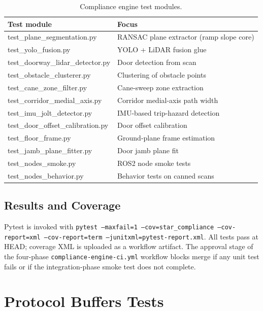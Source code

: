 \documentclass[11pt,letterpaper]{article}
\begin{document}
\begin{table}[H]
\centering
\caption{Compliance engine test modules.}
\label{tab:comp-tests}
\small
\begin{tabularx}{\linewidth}{l X}
\toprule
\textbf{Test module} & \textbf{Focus} \\
\midrule
test\_plane\_segmentation.py    & RANSAC plane extractor (ramp slope core) \\
test\_yolo\_fusion.py           & YOLO + LiDAR fusion glue \\
test\_doorway\_lidar\_detector.py & Door detection from scan \\
test\_obstacle\_clusterer.py    & Clustering of obstacle points \\
test\_cane\_zone\_filter.py     & Cane-sweep zone extraction \\
test\_corridor\_medial\_axis.py & Corridor medial-axis path width \\
test\_imu\_jolt\_detector.py    & IMU-based trip-hazard detection \\
test\_door\_offset\_calibration.py & Door offset calibration \\
test\_floor\_frame.py           & Ground-plane frame estimation \\
test\_jamb\_plane\_fitter.py    & Door jamb plane fit \\
test\_nodes\_smoke.py           & ROS2 node smoke tests \\
test\_nodes\_behavior.py        & Behavior tests on canned scans \\
\bottomrule
\end{tabularx}
\end{table}

\subsection{Results and Coverage}
Pytest is invoked with
\texttt{pytest --maxfail=1 --cov=star\_compliance
--cov-report=xml --cov-report=term --junitxml=pytest-report.xml}.
All tests pass at HEAD; coverage XML is uploaded as a workflow
artifact. The approval stage of the four-phase
\texttt{compliance-engine-ci.yml} workflow blocks merge if any unit
test fails or if the integration-phase smoke test does not complete.

\section{Protocol Buffers Tests}
\label{sec:proto}
\end{document}
